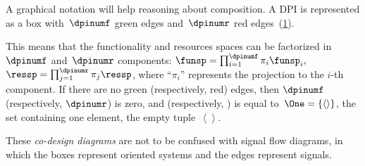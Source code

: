 \begin{center}
\end{center}


A graphical notation will help reasoning about composition. A DPI is represented as a box with~$\dpinumf$ green edges and~$\dpinumr$ red edges~(\cref{fig:dp_graphical}).

\begin{figure}[h]
    \centering
    \caption{\label{fig:dp_graphical}}
\end{figure}


This means that the functionality and resources spaces can be factorized in~$\dpinumf$ and~$\dpinumr$ components: $\funsp=\prod_{i=1}^{\dpinumf}\pi_{i}\funsp_{i},$
$\ressp=\prod_{j=1}^{\dpinumr}\pi_{j}\ressp$, where ``$\pi_{i}$''
represents the projection to the $i$-th component. If there are no
green (respectively, red) edges, then $\dpinumf$ (respectively, $\dpinumr$)
is zero, and \funsp (respectively, \ressp) is equal to~$\One=\{\left\langle \right\rangle \}$,
the set containing one element, the empty tuple~$\left\langle \right\rangle $.

These \emph{co-design diagrams} are not to be confused with signal
flow diagrams, in which the boxes represent oriented systems and the
edges represent signals.


